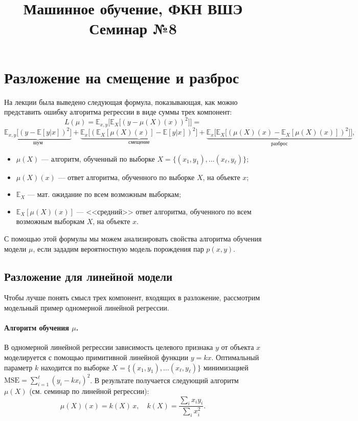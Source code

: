 \documentclass[12pt,fleqn]{article}
\title{Машинное обучение, ФКН ВШЭ\\Семинар №8}
\author{}
\date{}
\begin{document}
    \maketitle
    \section{Разложение на смещение и разброс}
    На лекции была выведено следующая формула, показывающая, как можно представить ошибку алгоритма регрессии в виде суммы трех компонент:
    \[
    L(\mu) = 
    \mathbb{E}_{x, y}\bigl[\mathbb{E}_{X}\bigl[ (y - \mu(X)(x))^2 \bigr]\bigr] = 
    	\]
    	\[
    \underbrace{\mathbb{E}_{x, y}\bigl[(y - \mathbb{E}[y|x] )^2\bigr]}_{\text{шум}} + \underbrace{\mathbb{E}_{x}\bigl[(\mathbb{E}_{X}[\mu(X)(x)] - \mathbb{E}[y|x] )^2\bigr]}_{\text{смещение}} +
    \underbrace{\mathbb{E}_{x}\bigl[\mathbb{E}_{X}\bigl[(\mu(X)(x) - \mathbb{E}_{X}[\mu(X)(x)] )^2\bigr]\bigr]}_{\text{разброс}},
    \]
    \begin{itemize}
    	\item $\mu(X)$ --- алгоритм, обученный по выборке $X = \{(x_1, y_1), \dots (x_\ell, y_\ell)\}$;
    	\item $\mu(X)(x)$ --- ответ алгоритма, обученного по выборке $X$, на объекте $x$;
    	\item $\mathbb{E}_{X}$ --- мат. ожидание по всем возможным выборкам;
    	\item $\mathbb{E}_{X}[\mu(X)(x)]$ --- <<средний>> ответ алгоритма, обученного по всем возможным выборкам $X$, на объекте $x$.
    \end{itemize}
    
    С помощью этой формулы мы можем анализировать свойства алгоритма обучения модели $\mu$, если зададим вероятностную модель порождения пар $p(x, y)$.
    
    \subsection{Разложение для линейной модели}
    Чтобы лучше понять смысл трех компонент, входящих в разложение, рассмотрим модельный пример одномерной линейной регрессии.
    
    \paragraph{Алгоритм обучения $\mu$.}  В одномерной линейной регрессии  зависимость целевого признака $y$ от объекта $x$ моделируется с помощью примитивной линейной функции $y = kx$. Оптимальный параметр $k$ находится по выборке $X = \{(x_1, y_1), \dots (x_\ell, y_\ell)\}$ минимизацией $\text{MSE}= \sum_{i=1}^\ell (y_i - k x_i)^2$. В результате получается следующий алгоритм $\mu(X)$ (см. семинар по линейной регрессии):
    \[
    \mu(X)(x) = k(X ) \,x, \quad k(X) = \frac{\sum_i x_i y_i}{\sum_i x_i^2}.
    \]
    
\end{document}

